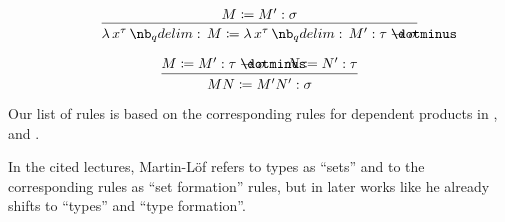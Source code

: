 \begin{remark}
\begin{thmenum}
\begin{thmenum}
      \begin{paracol}{2}
        \begin{leftcolumn}
          \ParacolAlignmentHack
          \begin{equation*}
            \begin{prooftree}
              \hypo{ M \coloneqq M': \sigma }
              \infer1{ \qabs {x^{\tau}} M \coloneqq \qabs {x^{\tau}} M': \tau \synimplies \sigma }
            \end{prooftree}
          \end{equation*}
        \end{leftcolumn}

        \begin{rightcolumn}
          \ParacolAlignmentHack
          \begin{equation*}
            \begin{prooftree}
              \hypo{ M \coloneqq M': \tau \synimplies \sigma }
              \hypo{ N \coloneqq N': \tau }
              \infer2{ M N \coloneqq M' N': \sigma }
            \end{prooftree}
          \end{equation*}
        \end{rightcolumn}
      \end{paracol}
    \end{thmenum}
  \end{thmenum}
\end{remark}
\begin{comments}
  \item Our list of rules is based on the corresponding rules for dependent products in , \cite[\S A.2]{UnivalentProject2024OctoberHoTT} and \cite[\S 8.1.10]{Mimram2020ProgramEqualsProof}.

  \item In the cited lectures, Martin-L\"of refers to types as \enquote{sets} and to the corresponding rules as \enquote{set formation} rules, but in later works like \cite{MartinLöf1994TypeJudgments} he already shifts to \enquote{types} and \enquote{type formation}.
\end{comments}

